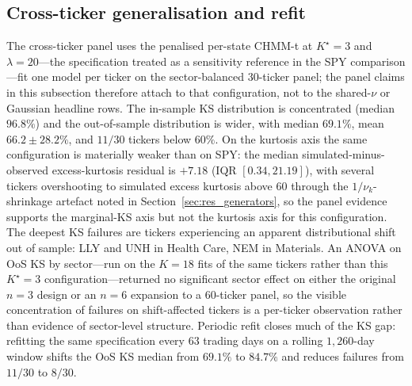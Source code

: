 \subsection{Cross-ticker generalisation and refit}
\label{sec:res_crossticker}

The cross-ticker panel uses the penalised per-state CHMM-t at $K^\star = 3$ and $\lambda = 20$---the specification treated as a sensitivity reference in the SPY comparison---fit one model per ticker on the sector-balanced 30-ticker panel; the panel claims in this subsection therefore attach to that configuration, not to the shared-$\nu$ or Gaussian headline rows. The in-sample KS distribution is concentrated (median $96.8\%$) and the out-of-sample distribution is wider, with median $69.1\%$, mean $66.2 \pm 28.2\%$, and $11/30$ tickers below $60\%$. On the kurtosis axis the same configuration is materially weaker than on SPY: the median simulated-minus-observed excess-kurtosis residual is $+7.18$ (IQR $[0.34, 21.19]$), with several tickers overshooting to simulated excess kurtosis above $60$ through the $1/\nu_k$-shrinkage artefact noted in Section~\ref{sec:res_generators}, so the panel evidence supports the marginal-KS axis but not the kurtosis axis for this configuration. The deepest KS failures are tickers experiencing an apparent distributional shift out of sample: LLY and UNH in Health Care, NEM in Materials. An ANOVA on OoS KS by sector---run on the $K = 18$ fits of the same tickers rather than this $K^\star = 3$ configuration---returned no significant sector effect on either the original $n = 3$ design or an $n = 6$ expansion to a 60-ticker panel, so the visible concentration of failures on shift-affected tickers is a per-ticker observation rather than evidence of sector-level structure. Periodic refit closes much of the KS gap: refitting the same specification every $63$ trading days on a rolling $1{,}260$-day window shifts the OoS KS median from $69.1\%$ to $84.7\%$ and reduces failures from $11/30$ to $8/30$.

